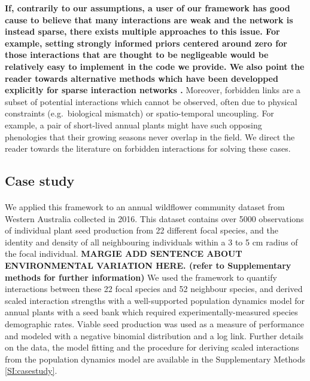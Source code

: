 \documentclass[a4,12pt]{article}
\begin{document}
\begin{refsection}
    \textbf{If, contrarily to our assumptions, a user of our framework has good cause to believe that many interactions are weak and the network is instead sparse, there exists multiple approaches to this issue. For example, setting strongly informed priors centered around zero for those interactions that are thought to be negligeable would be relatively easy to implement in the code we provide. We also point the reader towards alternative methods which have been developped explicitly for sparse interaction networks \parencite{Weiss-Lehman2022}.} Moreover, forbidden links are a subset of potential interactions which cannot be observed, often due to physical constraints (e.g.\ biological mismatch) or spatio-temporal uncoupling. For example, a pair of short-lived annual plants might have such opposing phenologies that their growing seasons never overlap in the field. We direct the reader towards the literature on forbidden interactions \parencite{Olesen2011, Jordano2016} for solving these cases. %


    \subsection{Case study}

       \paragraph{}
        We applied this framework to an annual wildflower community dataset from Western Australia collected in 2016. This dataset contains over 5000 observations of individual plant seed production from 22 different focal species, and the identity and density of all neighbouring individuals within a 3 to 5 cm radius of the focal individual. \textbf{MARGIE ADD SENTENCE ABOUT ENVIRONMENTAL VARIATION HERE. (refer to Supplementary methods for further information)} We used the framework to quantify interactions between these 22 focal species and 52 neighbour species, and derived scaled interaction strengths with a well-supported population dynamics model for annual plants with a seed bank \parencite{Levine2009, Bimler2018} which required experimentally-measured species demographic rates. Viable seed production was used as a measure of performance and modeled with a negative binomial distribution and a log link. Further details on the data, the model fitting and the procedure for deriving scaled interactions from the population dynamics model are available in the Supplementary Methods \ref{SI:casestudy}.



\end{refsection}
\end{document}
